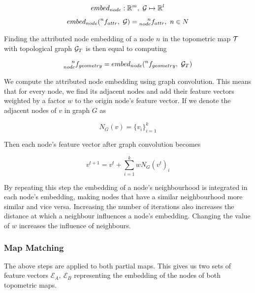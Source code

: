 \begin{equation}
    \label{eq:embed_node_01}
embed_{node}: \mathbb{R}^m,\ \mathcal{G} \mapsto \mathbb{R}^l
\end{equation}
\begin{equation}
    \label{eq:embed_node_02}
    embed_{node}(\prescript{n}{}{f_{attr}},\ \mathcal{G}) = \prescript{n}{node}{f_{attr}},\ n \in N
\end{equation}

Finding the attributed node embedding of a node \(n\) in the topometric map \(\mathcal{T}\) with topological graph \(\mathcal{G}_{T}\) is then equal to computing 

\begin{equation}
    \label{eq:f_node}
    \prescript{n}{node}{f_{geometry}}=embed_{node}(\prescript{n}{}{f_{geometry}},\ \graph_{T})
\end{equation}


We compute the attributed node embedding using graph convolution. This means that for every node, we find its adjacent nodes and add their feature vectors weighted by a factor \(w\) to the origin node's feature vector. If we denote the adjacent nodes of \(v\) in graph \(G\) as 

\begin{equation}
    \label{eq:N_G}
    N_{G}(v) = \{v_i\}_{i=1}^{k}
\end{equation}

Then each node's feature vector after graph convolution becomes 

\begin{equation}
    \label{eq:graph_convolve}
    v^{t+1} = v^t + \sum_{i=1}^k wN_{G}(v^t)_i
\end{equation}


By repeating this step the embedding of a node's neighbourhood is integrated in each node's embedding, making nodes that have a similar neighbourhood more similar and vice versa. Increasing the number of iterations also increases the distance at which a neighbour influences a node's embedding. Changing the value of \(w\) increases the influence of neighbours. 

\subsubsection{Map Matching}
The above steps are applied to both partial maps. This gives us two sets of feature vectors \(\mathcal{E}_A,\ \mathcal{E}_B\) representing the embedding of the nodes of both topometric maps.

